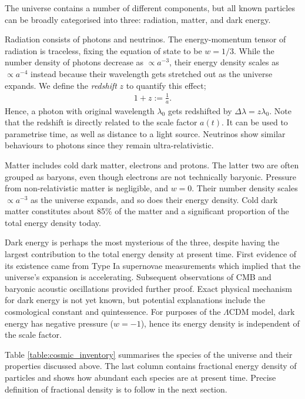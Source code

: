 The universe contains a number of different components, but all known particles can be broadly categorised into three: radiation, matter, and dark energy.

Radiation consists of photons and neutrinos. The energy-momentum tensor of radiation is traceless, fixing the equation of state to be $w=1/3$. While the number density of photons decrease as $\propto a^{-3}$, their energy density scales as $\propto a^{-4}$ instead because their wavelength gets stretched out as the universe expands. We define the \textit{redshift} $z$ to quantify this effect;
\begin{align}
	1 + z := \frac{1}{a}.	\label{def:redshift}
\end{align}
Hence, a photon with original wavelength $\lambda_0$ gets redshifted by $\Delta\lambda = z \lambda_0$. Note that the redshift is directly related to the scale factor $a(t)$. It can be used to parametrise time, as well as distance to a light source. Neutrinos show similar behaviours to photons since they remain ultra-relativistic.

Matter includes cold dark matter, electrons and protons. The latter two are often grouped as baryons, even though electrons are not technically baryonic. Pressure from non-relativistic matter is negligible, and $w = 0$. Their number density scales $\propto a^{-3}$ as the universe expands, and so does their energy density. Cold dark matter constitutes about 85\% of the matter and a significant proportion of the total energy density today.

Dark energy is perhaps the most mysterious of the three, despite having the largest contribution to the total energy density at present time. First evidence of its existence came from Type Ia supernovae measurements which implied that the universe's expansion is accelerating. Subsequent observations of CMB and baryonic acoustic oscillations provided further proof. Exact physical mechanism for dark energy is not yet known, but potential explanations include the cosmological constant and quintessence. For purposes of the $\Lambda$CDM model, dark energy has negative pressure ($w=-1$), hence its energy density is independent of the scale factor.

Table \ref{table:cosmic_inventory} summarises the species of the universe and their properties discussed above. The last column contains fractional energy density of particles and shows how abundant each species are at present time. Precise definition of fractional density is to follow in the next section.

